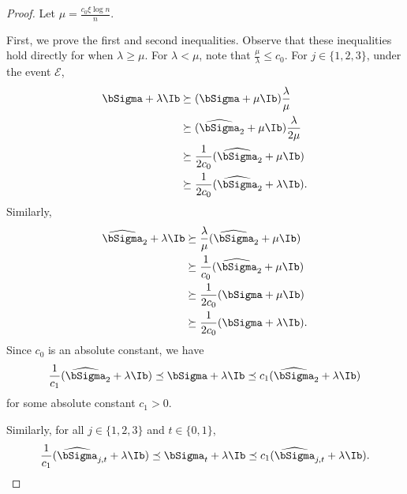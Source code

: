 \documentclass[12pt,a4paper,pdftex,onepage]{article}
\newcommand{\Sighat}{\widehat{{\bSigma}}}
\newcommand{\event}{\mathscr{E}}
\begin{document}
\begin{proof}
Let \(\mu = \frac{c_0 \xi \log n}{n}\). 

First, we prove the first and second inequalities. Observe that these inequalities hold directly for when \(\lambda \geq \mu\). 
For \(\lambda < \mu\), note that \(\frac{\mu}{\lambda} \leq c_0\). For \(j \in \{1,2,3\}\), under the event \(\event\),
\begin{align*}
\bSigma + \lambda \Ib &\succeq (\bSigma + \mu \Ib) \frac{\lambda}{\mu} \\
&\succeq (\Sighat_2 + \mu \Ib) \frac{\lambda}{2\mu} \\
&\succeq \frac{1}{2c_0} (\Sighat_2 + \mu \Ib) \\
&\succeq \frac{1}{2c_0} (\Sighat_2 + \lambda \Ib).
\end{align*}
Similarly,
\begin{align*}
\Sighat_2 + \lambda \Ib &\succeq \frac{\lambda}{\mu} (\Sighat_2 + \mu \Ib) \\
&\succeq \frac{1}{c_0} (\Sighat_2 + \mu \Ib) \\
&\succeq \frac{1}{2c_0} (\bSigma + \mu \Ib) \\
&\succeq \frac{1}{2c_0} (\bSigma + \lambda \Ib).
\end{align*}
Since \(c_0\) is an absolute constant, we have
\begin{align*}
\frac{1}{c_1}(\Sighat_{2} + \lambda \Ib) \preceq \bSigma + \lambda \Ib \preceq c_1 (\Sighat_{2} + \lambda \Ib)
\end{align*}
for some absolute constant \(c_1 > 0\).

Similarly, for all \(j \in \{1,2,3\}\) and \(t \in \{0,1\}\),
\begin{align*}
\frac{1}{c_1}(\Sighat_{j,t} + \lambda \Ib) \preceq \bSigma_{t} + \lambda \Ib \preceq c_1 (\Sighat_{j,t} + \lambda \Ib).
\end{align*}


\end{proof}
\end{document}
